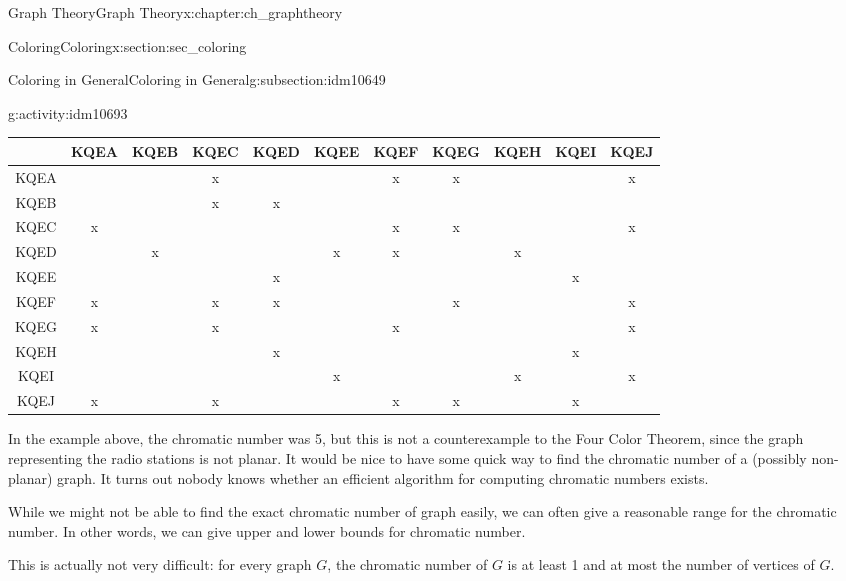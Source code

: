 \documentclass[oneside,10pt,]{book}
\numberwithin{equation}{chapter}
\begin{document}
\begin{chapterptx}{Graph Theory}{}{Graph Theory}{}{}{x:chapter:ch_graphtheory}
\begin{sectionptx}{Coloring}{}{Coloring}{}{}{x:section:sec_coloring}
\begin{subsectionptx}{Coloring in General}{}{Coloring in General}{}{}{g:subsection:idm10649}
\begin{activity}{}{g:activity:idm10693}
\begin{sidebyside}{1}{0}{0}{0}
\begin{sbspanel}{1}
{\begin{tabular}{c|c|c|c|c|c|c|c|c|c|c|}
 & {\tiny KQEA}&{\tiny KQEB}&{\tiny KQEC}&{\tiny KQED}&{\tiny KQEE}&{\tiny KQEF}&{\tiny KQEG}&{\tiny  KQEH}&{\tiny  KQEI}&{\tiny KQEJ } \\ \hline
{\tiny KQEA }&      &      &   x  &      &      &   x  &   x  &      &      &  x   \\ \hline
{\tiny KQEB }&      &      &   x  &   x  &      &      &      &      &      &      \\ \hline
{\tiny KQEC }&   x  &      &      &      &      &   x  &   x  &      &      &  x   \\ \hline
{\tiny KQED }&      &  x   &      &      &  x   &  x   &      &  x   &      &      \\ \hline
{\tiny KQEE }&      &      &      &  x   &      &      &      &      &  x   &      \\ \hline
{\tiny KQEF }&  x   &      &  x   &  x   &      &      &   x  &      &      &  x   \\ \hline
{\tiny KQEG }&  x   &      &  x   &      &      &  x   &      &      &      &  x   \\ \hline
{\tiny KQEH }&      &      &      &  x   &      &      &      &      &  x   &      \\ \hline
{\tiny KQEI }&      &      &      &      &  x   &      &      &  x   &      &  x   \\ \hline
{\tiny KQEJ }&  x   &      &  x   &      &      &  x   &   x  &      &  x   &      \\ \hline
\end{tabular}
}%
\end{sbspanel}%
\end{sidebyside}%
\end{activity}
In the example above, the chromatic number was 5, but this is not a counterexample to the Four Color Theorem, since the graph representing the radio stations is not planar. It would be nice to have some quick way to find the chromatic number of a (possibly non-planar) graph. It turns out nobody knows whether an efficient algorithm for computing chromatic numbers exists.%
\par
While we might not be able to find the exact chromatic number of graph easily, we can often give a reasonable range for the chromatic number. In other words, we can give upper and lower bounds for chromatic number.%
\par
This is actually not very difficult: for every graph \(G\), the chromatic number of \(G\) is at least 1 and at most the number of vertices of \(G\).%
\par

\end{subsectionptx}
\end{sectionptx}
\end{chapterptx}
\end{document}
